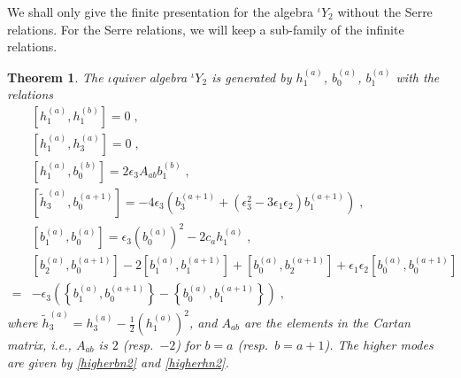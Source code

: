 \documentclass[11pt]{article}
\numberwithin{equation}{section}
\numberwithin{figure}{section}
\numberwithin{table}{section}
\newtheorem{theorem}{Theorem}[section]
\begin{document}
We shall only give the finite presentation for the algebra ${}^\iota Y_2$ without the Serre relations. For the Serre relations, we will keep a sub-family of the infinite relations.
\begin{theorem}
	The $\iota$quiver algebra ${}^\iota Y_2$ is generated by $h^{(a)}_1$, $b^{(a)}_0$, $b^{(a)}_1$ with the relations
	\begin{subequations}
		\begin{align}
			&\left[h^{(a)}_1,h^{(b)}_1\right]=0\;,\\
			&\left[h^{(a)}_1,h^{(a)}_3\right]=0\;,\\
			&\left[h^{(a)}_1,b^{(b)}_0\right]=2\epsilon_3A_{ab}b^{(b)}_1\;,\\
			&\left[\widetilde{h}^{(a)}_3,b^{(a+1)}_0\right]=-4\epsilon_3\left(b^{(a+1)}_3+\left(\epsilon_3^2-3\epsilon_1\epsilon_2\right)b^{(a+1)}_1\right)\;,\\
			&\left[b^{(a)}_1,b^{(a)}_0\right]=\epsilon_3\left(b^{(a)}_0\right)^2-2c_ah^{(a)}_1\;,\\
			&\left[b^{(a)}_2,b^{(a+1)}_0\right]-2\left[b^{(a)}_1,b^{(a+1)}_1\right]+\left[b^{(a)}_0,b^{(a+1)}_2\right]+\epsilon_1\epsilon_2\left[b^{(a)}_0,b^{(a+1)}_0\right]\nonumber\\
			=&-\epsilon_3\left(\left\{b^{(a)}_1,b^{(a+1)}_0\right\}-\left\{b^{(a)}_0,b^{(a+1)}_1\right\}\right)\;,
		\end{align}
	\end{subequations}
	where $\widetilde{h}^{(a)}_3=h^{(a)}_3-\frac{1}{2}\left(h^{(a)}_1\right)^2$, and $A_{ab}$ are the elements in the Cartan matrix, i.e., $A_{ab}$ is $2$ (resp.~$-2$) for $b=a$ (resp.~$b=a+1$). The higher modes are given by \eqref{higherbn2} and \eqref{higherhn2}.
\end{theorem}
\end{document}
